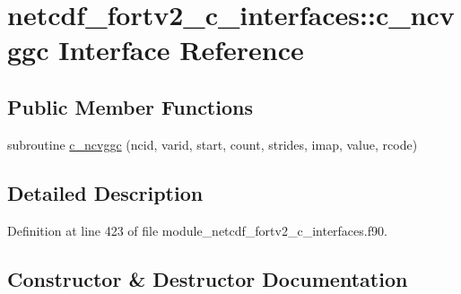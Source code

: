 \hypertarget{interfacenetcdf__fortv2__c__interfaces_1_1c__ncvggc}{}\section{netcdf\+\_\+fortv2\+\_\+c\+\_\+interfaces\+:\+:c\+\_\+ncvggc Interface Reference}
\label{interfacenetcdf__fortv2__c__interfaces_1_1c__ncvggc}
\subsection*{Public Member Functions}
\begin{DoxyCompactItemize}
\item 
subroutine \hyperlink{interfacenetcdf__fortv2__c__interfaces_1_1c__ncvggc_addfec576157a36aac78a11342ff3611c}{c\+\_\+ncvggc} (ncid, varid, start, count, strides, imap, value, rcode)
\end{DoxyCompactItemize}


\subsection{Detailed Description}


Definition at line 423 of file module\+\_\+netcdf\+\_\+fortv2\+\_\+c\+\_\+interfaces.\+f90.



\subsection{Constructor \& Destructor Documentation}
\mbox{\label{interfacenetcdf__fortv2__c__interfaces_1_1c__ncvggc_addfec576157a36aac78a11342ff3611c}} 
